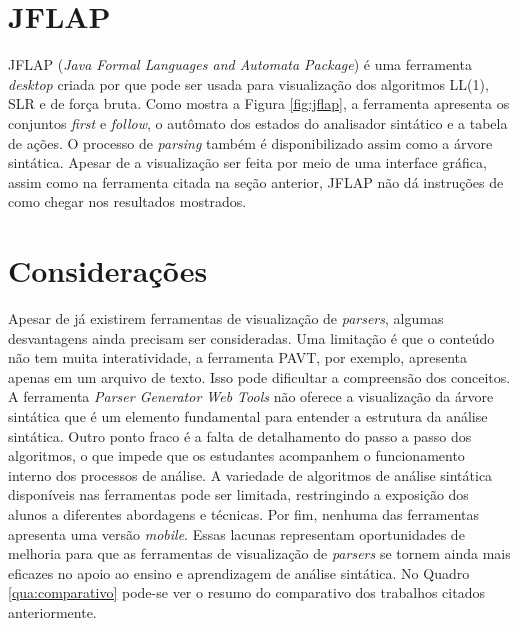 \section{JFLAP}
JFLAP (\textit{Java Formal Languages and Automata Package}) é uma ferramenta \textit{desktop} criada por \textcite{jflap} que pode ser usada para visualização dos algoritmos LL(1), SLR e de força bruta. Como mostra a Figura \ref{fig:jflap}, a ferramenta apresenta os conjuntos \textit{first} e \textit{follow}, o autômato dos estados do analisador sintático e a tabela de ações. O processo de \textit{parsing} também é disponibilizado assim como a árvore sintática. Apesar de a visualização ser feita por meio de uma interface gráfica, assim como na ferramenta citada na seção anterior, JFLAP não dá instruções de como chegar nos resultados mostrados.

\section{Considerações}
Apesar de já existirem ferramentas de visualização de \textit{parsers}, algumas desvantagens ainda precisam ser consideradas. Uma limitação é que o conteúdo não tem muita interatividade, a ferramenta PAVT, por exemplo, apresenta apenas em um arquivo de texto. Isso pode dificultar a compreensão dos conceitos. A ferramenta \textit{Parser Generator Web Tools} não oferece a visualização da árvore sintática que é um elemento fundamental para entender a estrutura da análise sintática. Outro ponto fraco é a falta de detalhamento do passo a passo dos algoritmos, o que impede que os estudantes acompanhem o funcionamento interno dos processos de análise. A variedade de algoritmos de análise sintática disponíveis nas ferramentas pode ser limitada, restringindo a exposição dos alunos a diferentes abordagens e técnicas. Por fim, nenhuma das ferramentas apresenta uma versão \textit{mobile}. Essas lacunas representam oportunidades de melhoria para que as ferramentas de visualização de \textit{parsers} se tornem ainda mais eficazes no apoio ao ensino e aprendizagem de análise sintática. No Quadro \ref{qua:comparativo} pode-se ver o resumo do comparativo dos trabalhos citados anteriormente.

